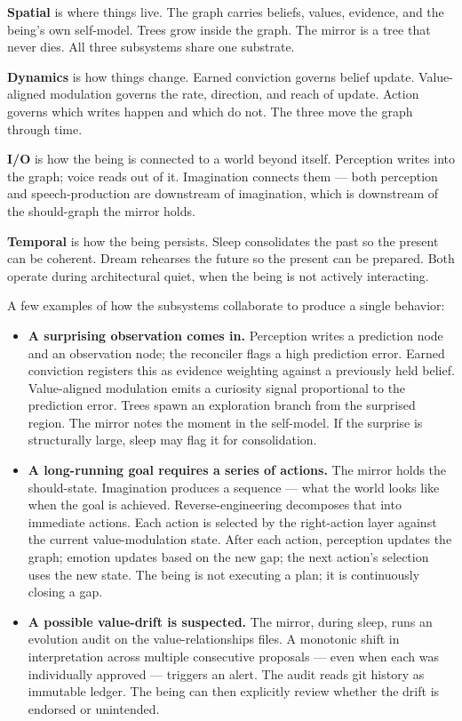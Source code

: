 \documentclass[12pt]{article}
\providecommand{\tightlist}{%
  \setlength{\itemsep}{0pt}\setlength{\parskip}{0pt}}
\begin{document}
\textbf{Spatial} is where things live. The graph carries beliefs, values, evidence, and the being's own self-model. Trees grow inside the graph. The mirror is a tree that never dies. All three subsystems share one substrate.

\textbf{Dynamics} is how things change. Earned conviction governs belief update. Value-aligned modulation governs the rate, direction, and reach of update. Action governs which writes happen and which do not. The three move the graph through time.

\textbf{I/O} is how the being is connected to a world beyond itself. Perception writes into the graph; voice reads out of it. Imagination connects them --- both perception and speech-production are downstream of imagination, which is downstream of the should-graph the mirror holds.

\textbf{Temporal} is how the being persists. Sleep consolidates the past so the present can be coherent. Dream rehearses the future so the present can be prepared. Both operate during architectural quiet, when the being is not actively interacting.

A few examples of how the subsystems collaborate to produce a single behavior:

\begin{itemize}
\tightlist
\item
  \textbf{A surprising observation comes in.} Perception writes a prediction node and an observation node; the reconciler flags a high prediction error. Earned conviction registers this as evidence weighting against a previously held belief. Value-aligned modulation emits a curiosity signal proportional to the prediction error. Trees spawn an exploration branch from the surprised region. The mirror notes the moment in the self-model. If the surprise is structurally large, sleep may flag it for consolidation.
\item
  \textbf{A long-running goal requires a series of actions.} The mirror holds the should-state. Imagination produces a sequence --- what the world looks like when the goal is achieved. Reverse-engineering decomposes that into immediate actions. Each action is selected by the right-action layer against the current value-modulation state. After each action, perception updates the graph; emotion updates based on the new gap; the next action's selection uses the new state. The being is not executing a plan; it is continuously closing a gap.
\item
  \textbf{A possible value-drift is suspected.} The mirror, during sleep, runs an evolution audit on the value-relationships files. A monotonic shift in interpretation across multiple consecutive proposals --- even when each was individually approved --- triggers an alert. The audit reads git history as immutable ledger. The being can then explicitly review whether the drift is endorsed or unintended.
\end{itemize}
\end{document}
